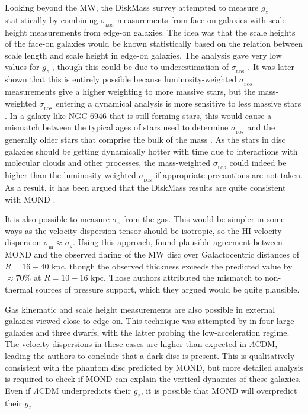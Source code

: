 \documentclass[fleqn,usenatbib,useAMS,onecolumn]{mnras} %
\begin{document}
Looking beyond the MW, the DiskMass survey \citep{Bershady_2010} attempted to measure $g_z$ statistically by combining $\sigma_{_\text{LOS}}$ measurements from face-on galaxies with scale height measurements from edge-on galaxies. The idea was that the scale heights of the face-on galaxies would be known statistically based on the relation between scale length and scale height in edge-on galaxies. The analysis gave very low values for $g_z$ \citep{Angus_2015}, though this could be due to underestimation of $\sigma_{_\text{LOS}}$ \citep{Angus_2016_DiskMass}. It was later shown that this is entirely possible because luminosity-weighted $\sigma_{_\text{LOS}}$ measurements give a higher weighting to more massive stars, but the mass-weighted $\sigma_{_\text{LOS}}$ entering a dynamical analysis is more sensitive to less massive stars \citep{Aniyan_2016, Aniyan_2018}. In a galaxy like NGC 6946 that is still forming stars, this would cause a mismatch between the typical ages of stars used to determine $\sigma_{_\text{LOS}}$ and the generally older stars that comprise the bulk of the mass \citep{Aniyan_2021}. As the stars in disc galaxies should be getting dynamically hotter with time due to interactions with molecular clouds \citep{Aumer_2016} and other processes, the mass-weighted $\sigma_{_\text{LOS}}$ could indeed be higher than the luminosity-weighted $\sigma_{_\text{LOS}}$ if appropriate precautions are not taken. As a result, it has been argued that the DiskMass results are quite consistent with MOND \citep{Milgrom_2018_DiskMass}.

It is also possible to measure $\sigma_z$ from the gas. This would be simpler in some ways as the velocity dispersion tensor should be isotropic, so the HI velocity dispersion $\sigma_{_\text{HI}} \approx \sigma_z$. Using this approach, \citet{Sanchez_2008} found plausible agreement between MOND and the observed flaring of the MW disc over Galactocentric distances of $R = 16-40$ kpc, though the observed thickness exceeds the predicted value by $\approx 70\%$ at $R = 10-16$ kpc. Those authors attributed the mismatch to non-thermal sources of pressure support, which they argued would be quite plausible.

Gas kinematic and scale height measurements are also possible in external galaxies viewed close to edge-on. This technique was attempted by \citet{Das_2020} in four large galaxies and three dwarfs, with the latter probing the low-acceleration regime. The velocity dispersions in these cases are higher than expected in $\Lambda$CDM, leading the authors to conclude that a dark disc is present. This is qualitatively consistent with the phantom disc predicted by MOND, but more detailed analysis is required to check if MOND can explain the vertical dynamics of these galaxies. Even if $\Lambda$CDM underpredicts their $g_z$, it is possible that MOND will overpredict their $g_z$.
\end{document}
